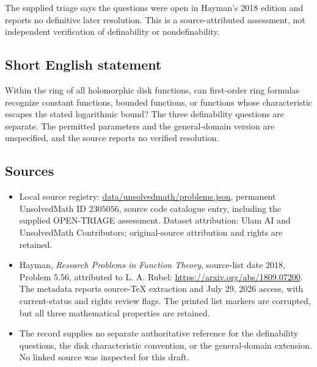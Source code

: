 \documentclass[11pt]{article}
\begin{document}
The supplied triage says the questions were open in Hayman's 2018 edition and reports no definitive later resolution. This is a source-attributed assessment, not independent verification of definability or nondefinability.
\subsection{Short English statement}
Within the ring of all holomorphic disk functions, can first-order ring formulas recognize constant functions, bounded functions, or functions whose characteristic escapes the stated logarithmic bound? The three definability questions are separate. The permitted parameters and the general-domain version are unspecified, and the source reports no verified resolution.
\subsection{Sources}
\begin{itemize}
\item Local source registry: \url{data/unsolvedmath/problems.json}, permanent UnsolvedMath ID $2305056$, source code catalogue entry, including the supplied OPEN-TRIAGE assessment. Dataset attribution: Ulam AI and UnsolvedMath Contributors; original-source attribution and rights are retained.
\item Hayman, \emph{Research Problems in Function Theory}, source-list date 2018, Problem 5.56, attributed to L. A. Rubel: \url{https://arxiv.org/abs/1809.07200}. The metadata reports source-TeX extraction and July 29, 2026 access, with current-status and rights review flags. The printed list markers are corrupted, but all three mathematical properties are retained.
\item The record supplies no separate authoritative reference for the definability questions, the disk characteristic convention, or the general-domain extension. No linked source was inspected for this draft.
\end{itemize}
\end{document}
